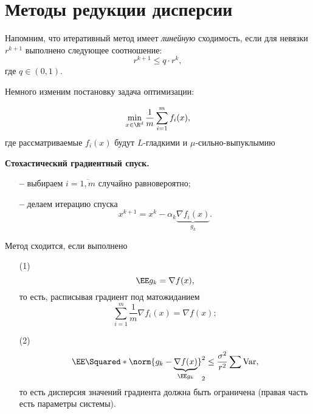 \section{Методы редукции дисперсии}

Напомним, что итеративный метод имеет \textit{линейную} сходимость, если для невязки $r^{k + 1}$ выполнено следующее соотношение:
\begin{equation*}
    r^{k + 1} \leq q \cdot r^k,
\end{equation*}
где $q \in (0, 1)$.

Немного изменим постановку задача оптимизации:
\begin{task}
    \begin{equation*}
        \min \limits_{x \in \R^d} \frac{1}{m} \sum \limits_{i = 1}^m f_i(x),
    \end{equation*}
    где рассматриваемые $f_i(x)$ будут $L$-гладкими и $\mu$-сильно-выпуклымию
\end{task}


\begin{task}
    \textbf{Стохастический градиентный спуск.}
\begin{itemize}
    \item[\textbf{--}] выбираем $i = \overline{1, m}$ случайно равновероятно; 
    \item[\textbf{--}] делаем итерацию спуска 
    \begin{equation*}
        x^{k + 1} = x^k - \alpha_k\underbrace{\nabla f_i(x)}_{g_k}.
    \end{equation*}
\end{itemize}
\end{task}
\begin{theorem}
    Метод сходится, если выполнено
    \begin{enumerate}
        \item[(1)] \begin{equation*}
            \EE g_k  = \nabla f(x),
        \end{equation*}
        то есть, расписывая градиент под матожиданием
        \begin{equation*}
            \sum_{i = 1}^m \frac{1}{m}\nabla f_i(x) = \nabla f(x);
        \end{equation*}
        \item[(2)] \begin{equation*}
            \EE\Squared*{\norm{g_k - \underbrace{\nabla f(x)}_{\EE g_k}}_2^2} \leq \frac{\sigma^2}{r^2} \sum \text{Var},
        \end{equation*}
        то есть дисперсия значений градиента должна быть ограничена (правая часть есть параметры системы).
    \end{enumerate}
\end{theorem}

